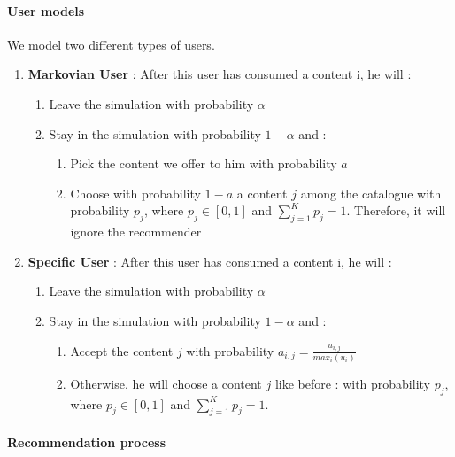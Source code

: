 \documentclass[a4paper]{article}
\begin{document}
\paragraph{User models} 
We model two different types of users.
\begin{enumerate}
    \item \textbf{Markovian User} : After this user has consumed a content i, he will : 
    	\begin{enumerate}
	\item Leave the simulation with probability $\alpha$
	\item Stay in the simulation with probability $1 - \alpha$ and :
	\begin{enumerate}
        \item Pick the content we offer to him with probability $a$
        \item Choose with probability $1 - a$ a content $j$ among the catalogue with probability $p_j$, where $p_j \in [0,1]$ and $\sum_{j=1}^{K}p_j = 1$. Therefore, it will ignore the recommender
        
        
    \end{enumerate}
		
	\end{enumerate}    
    
    
    \item \textbf{Specific User} : After this user has consumed a content i, he will :
    \begin{enumerate}
    	\item Leave the simulation with probability $\alpha$
	\item Stay in the simulation with probability $1 - \alpha$ and :  
	\begin{enumerate}
        \item Accept the content $j$ with probability $a_{i,j} = \frac{u_{i,j}}{max_i (u_i)}$
        \item Otherwise, he will choose a content $j$ like before : with probability $p_j$, where $p_j \in [0,1]$ and $\sum_{j=1}^{K}p_j = 1$. 
    \end{enumerate}
	
    \end{enumerate}
        
\end{enumerate}

\paragraph{Recommendation process}
\end{document}
